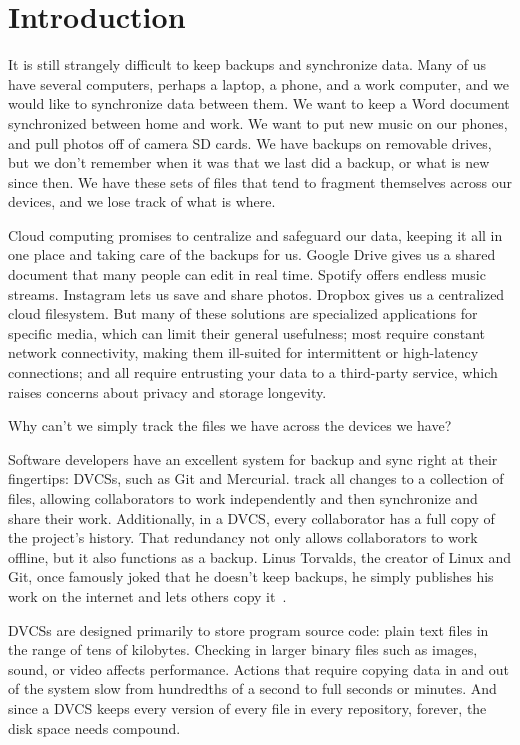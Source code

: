 \chapter{Introduction}

It is still strangely difficult to keep backups and synchronize data. Many of us
have several computers, perhaps a laptop, a phone, and a work computer, and we
would like to synchronize data between them. We want to keep a Word document
synchronized between home and work. We want to put new music on our phones, and
pull photos off of camera SD cards. We have backups on removable drives, but we
don't remember when it was that we last did a backup, or what is new since then.
We have these sets of files that tend to fragment themselves across our devices,
and we lose track of what is where.

Cloud computing promises to centralize and safeguard our data, keeping it all in
one place and taking care of the backups for us. Google Drive gives us a shared
document that many people can edit in real time. Spotify offers endless music
streams. Instagram lets us save and share photos. Dropbox gives us a centralized
cloud filesystem. But many of these solutions are specialized applications for
specific media, which can limit their general usefulness; most require constant
network connectivity, making them ill-suited for intermittent or high-latency
connections; and all require entrusting your data to a third-party service,
which raises concerns about privacy and storage longevity.

Why can't we simply track the files we have across the devices we have?


Software developers have an excellent system for backup and sync right at their
fingertips: \glspl{DVCS}, such as Git and Mercurial.  track all
changes to a collection of files, allowing collaborators to work independently
and then synchronize and share their work. Additionally, in a \gls{DVCS}, every
collaborator has a full copy of the project's history. That redundancy not only
allows collaborators to work offline, but it also functions as a backup. Linus
Torvalds, the creator of Linux and Git, once famously joked that he doesn't keep
backups, he simply publishes his work on the internet and lets others copy
it~\cite{linus_no_backups}.

\glspl{DVCS} are designed primarily to store program source code: plain text
files in the range of tens of kilobytes. Checking in larger binary files such as
images, sound, or video affects performance. Actions that require copying data
in and out of the system slow from hundredths of a second to full seconds or
minutes. And since a \gls{DVCS} keeps every version of every file in every
\gls{repository}, forever, the disk space needs compound.

